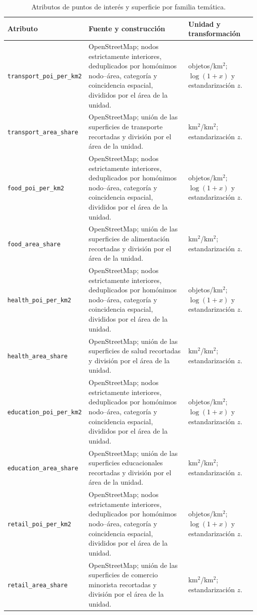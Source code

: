 \begin{table}[H]
  \centering
  \scriptsize
  \caption{Atributos de puntos de interés y superficie por familia temática.}
  \label{tab:anexo_atributos_poi}
  \begin{tabularx}{\textwidth}{@{}p{}p{}X@{}}
    \toprule
    \textbf{Atributo} & \textbf{Fuente y construcción} & \textbf{Unidad y transformación} \\
    \midrule
    \texttt{transport\_poi\_per\_km2} &
    OpenStreetMap; nodos estrictamente interiores, deduplicados por homónimos nodo--área, categoría y coincidencia espacial, divididos por el área de la unidad. &
    objetos/km$^2$; $\log(1+x)$ y estandarización $z$. \\
    \texttt{transport\_area\_share} &
    OpenStreetMap; unión de las superficies de transporte recortadas y división por el área de la unidad. &
    km$^2$/km$^2$; estandarización $z$. \\
    \texttt{food\_poi\_per\_km2} &
    OpenStreetMap; nodos estrictamente interiores, deduplicados por homónimos nodo--área, categoría y coincidencia espacial, divididos por el área de la unidad. &
    objetos/km$^2$; $\log(1+x)$ y estandarización $z$. \\
    \texttt{food\_area\_share} &
    OpenStreetMap; unión de las superficies de alimentación recortadas y división por el área de la unidad. &
    km$^2$/km$^2$; estandarización $z$. \\
    \texttt{health\_poi\_per\_km2} &
    OpenStreetMap; nodos estrictamente interiores, deduplicados por homónimos nodo--área, categoría y coincidencia espacial, divididos por el área de la unidad. &
    objetos/km$^2$; $\log(1+x)$ y estandarización $z$. \\
    \texttt{health\_area\_share} &
    OpenStreetMap; unión de las superficies de salud recortadas y división por el área de la unidad. &
    km$^2$/km$^2$; estandarización $z$. \\
    \texttt{education\_poi\_per\_km2} &
    OpenStreetMap; nodos estrictamente interiores, deduplicados por homónimos nodo--área, categoría y coincidencia espacial, divididos por el área de la unidad. &
    objetos/km$^2$; $\log(1+x)$ y estandarización $z$. \\
    \texttt{education\_area\_share} &
    OpenStreetMap; unión de las superficies educacionales recortadas y división por el área de la unidad. &
    km$^2$/km$^2$; estandarización $z$. \\
    \texttt{retail\_poi\_per\_km2} &
    OpenStreetMap; nodos estrictamente interiores, deduplicados por homónimos nodo--área, categoría y coincidencia espacial, divididos por el área de la unidad. &
    objetos/km$^2$; $\log(1+x)$ y estandarización $z$. \\
    \texttt{retail\_area\_share} &
    OpenStreetMap; unión de las superficies de comercio minorista recortadas y división por el área de la unidad. &
    km$^2$/km$^2$; estandarización $z$. \\
    \bottomrule
  \end{tabularx}
\end{table}

